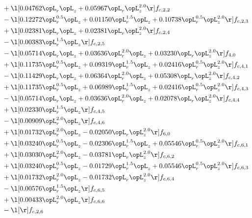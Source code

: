 \begin{alignat}{2}
& + \l[  0.04762 \opL_r \opL_z +  0.05967 \opL_r \opL_z^{2.0}  \r] f_{c,2,2} \nonumber \\ 
& - \l[  0.12272 \opL_r^{0.5} \opL_z +  0.01150 \opL_r^{1.5} \opL_z +  0.10738 \opL_r^{0.5} \opL_z^{2.0}  \r] f_{c,2,3} \nonumber \\ 
& + \l[  0.02381 \opL_r \opL_z +  0.02381 \opL_r \opL_z^{2.0}  \r] f_{c,2,4} \nonumber \\ 
& - \l[  0.00383 \opL_r^{1.5} \opL_z  \r] f_{c,2,5} \nonumber \\ 
& - \l[  0.05714 \opL_r \opL_z +  0.03636 \opL_r^{2.0} \opL_z +  0.03230 \opL_r \opL_z^{2.0}  \r] f_{4,0} \nonumber \\ 
& + \l[  0.11735 \opL_r^{0.5} \opL_z +  0.09319 \opL_r^{1.5} \opL_z +  0.02416 \opL_r^{0.5} \opL_z^{2.0}  \r] f_{c,4,1} \nonumber \\ 
& - \l[  0.11429 \opL_r \opL_z +  0.06364 \opL_r^{2.0} \opL_z +  0.05308 \opL_r \opL_z^{2.0}  \r] f_{c,4,2} \nonumber \\ 
& + \l[  0.11735 \opL_r^{0.5} \opL_z +  0.06989 \opL_r^{1.5} \opL_z +  0.02416 \opL_r^{0.5} \opL_z^{2.0}  \r] f_{c,4,3} \nonumber \\ 
& - \l[  0.05714 \opL_r \opL_z +  0.03636 \opL_r^{2.0} \opL_z +  0.02078 \opL_r \opL_z^{2.0}  \r] f_{c,4,4} \nonumber \\ 
& + \l[  0.02330 \opL_r^{1.5} \opL_z  \r] f_{c,4,5} \nonumber \\ 
& - \l[  0.00909 \opL_r^{2.0} \opL_z  \r] f_{c,4,6} \nonumber \\ 
& + \l[  0.01732 \opL_r^{2.0} \opL_z   -0.02050 \opL_r \opL_z^{2.0}  \r] f_{6,0} \nonumber \\ 
& + \l[  0.03240 \opL_r^{0.5} \opL_z   -0.02306 \opL_r^{1.5} \opL_z +  0.05546 \opL_r^{0.5} \opL_z^{2.0}  \r] f_{c,6,1} \nonumber \\ 
& + \l[  0.03030 \opL_r^{2.0} \opL_z   -0.03781 \opL_r \opL_z^{2.0}  \r] f_{c,6,2} \nonumber \\ 
& + \l[  0.03240 \opL_r^{0.5} \opL_z   -0.01729 \opL_r^{1.5} \opL_z +  0.05546 \opL_r^{0.5} \opL_z^{2.0}  \r] f_{c,6,3} \nonumber \\ 
& + \l[  0.01732 \opL_r^{2.0} \opL_z   -0.01732 \opL_r \opL_z^{2.0}  \r] f_{c,6,4} \nonumber \\ 
& - \l[  0.00576 \opL_r^{1.5} \opL_z  \r] f_{c,6,5} \nonumber \\ 
& + \l[  0.00433 \opL_r^{2.0} \opL_z  \r] f_{c,6,6} \nonumber \\ 
& - \l[  \r] f_{c,2,6} \nonumber \\ 
\end{alignat} 


